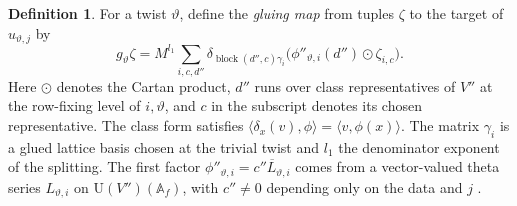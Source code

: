 \documentclass[reqno]{amsart}
\theoremstyle{definition}
\newtheorem{definition}{Definition}[section]
\theoremstyle{plain}
\theoremstyle{remark}
\newcommand{\vt}{\vartheta}
\begin{document}
\begin{definition}\label{def:glue}
For a twist \(\vt\), define the \emph{gluing map} from tuples \(\zeta\) to the target of \(u_{\vt,j}\) by
\[
  g_\vt\zeta=M^{l_1}\sum_{i,c,d''}\delta_{\operatorname{block}(d'',c)\gamma_i}
     \bigl(\phi''_{\vt,i}(d'')\mathbin{\odot}\zeta_{i,c}\bigr).
\]
Here \(\mathbin{\odot}\) denotes the Cartan product, \(d''\) runs over class representatives of \(V''\) at the row-fixing level of \(i,\vt\), and \(c\) in the subscript denotes its chosen representative.  The class form satisfies \(\langle\delta_x(v),\phi\rangle=\langle v,\phi(x)\rangle\).  The matrix \(\gamma_i\) is a glued lattice basis chosen at the trivial twist and \(l_1\) the denominator exponent of the splitting.  The first factor \(\phi''_{\vt,i}=\overline{c''L_{\vt,i}}\) comes from a vector-valued theta series \(L_{\vt,i}\) on \(\mathrm U(V'')(\mathbb A_f)\), with \(c''\ne0\) depending only on the data and \(j\) \cite[TestedForms, line 138, GluedLattices, line 550, GluedForms, line 450, LineCoordinates, line 331 and GluingMaps, lines 190--199, 211--247, 350--354]{GL}.
\end{definition}
\end{document}
